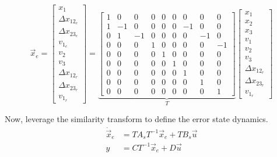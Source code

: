 \documentclass[12pt,onecolumn,reqno]{amsart}
\begin{document}
\begin{equation}
  \vec{x}_{e} = 
  \begin{bmatrix}
    x_{1}               \\
    \Delta x_{12_{e}}   \\
    \Delta x_{23_{e}}   \\
    v_{1_{e}}           \\
    v_{2}               \\
    v_{3}               \\ 
    \Delta x_{12_{r}}   \\
    \Delta x_{23_{r}}   \\
    v_{1_{r}}
  \end{bmatrix}
  =
  \underbrace{
  \begin{bmatrix}
    1 & 0 & 0 & 0 & 0 & 0 & 0 & 0 & 0 \\
    1 & -1 & 0 & 0 & 0 & 0 & -1 & 0 & 0 \\
    0 & 1 & -1 & 0 & 0 & 0 & 0 & -1 & 0 \\
    0 & 0 & 0 & 1 & 0 & 0 & 0 & 0 & -1 \\
    0 & 0 & 0 & 0 & 1 & 0 & 0 & 0 & 0 \\
    0 & 0 & 0 & 0 & 0 & 1 & 0 & 0 & 0 \\
    0 & 0 & 0 & 0 & 0 & 0 & 1 & 0 & 0 \\
    0 & 0 & 0 & 0 & 0 & 0 & 0 & 1 & 0 \\
    0 & 0 & 0 & 0 & 0 & 0 & 0 & 0 & 1
  \end{bmatrix}
  }_{T}
  \begin{bmatrix}
    x_{1}             \\
    x_{2}             \\
    x_{3}             \\
    v_{1}             \\
    v_{2}             \\
    v_{3}             \\ 
    \Delta x_{12_{r}} \\
    \Delta x_{23_{r}} \\
    v_{1_{r}}
  \end{bmatrix}
\end{equation}

Now, leverage the similarity transform to define the error state dynamics.
\begin{align}
  \dot{\vec{x}}_{e} &= T A_{s} T^{-1} \vec{x}_{e} + T B_{s} \vec{u} \\
  y &= C T^{-1} \vec{x}_{e} + D \vec{u}
\end{align}
\end{document}
